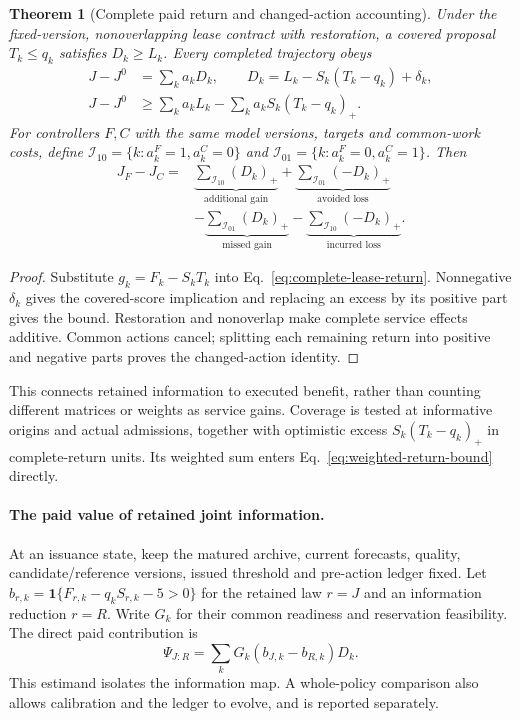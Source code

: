 \documentclass[10pt]{article}
\newtheorem{theorem}{Theorem}
\begin{document}
\begin{theorem}[Complete paid return and changed-action accounting]
\label{thm:paid-return}
Under the fixed-version, nonoverlapping lease contract with restoration,
a covered proposal $T_k\leq q_k$ satisfies $D_k\geq L_k$.
Every completed trajectory obeys
\begin{equation}
\begin{aligned}
 J-J^0&=\sum_k a_kD_k,\qquad
 D_k=L_k-S_k(T_k-q_k)+\delta_k,\\
 J-J^0&\geq\sum_k a_kL_k-\sum_k a_kS_k(T_k-q_k)_+.
\end{aligned}
\label{eq:weighted-return-bound}
\end{equation}
For controllers $F,C$ with the same model versions, targets and common-work
costs, define $\mathcal I_{10}=\{k:a_k^F=1,a_k^C=0\}$ and
$\mathcal I_{01}=\{k:a_k^F=0,a_k^C=1\}$. Then
\begin{equation}
\begin{aligned}
 J_F-J_C={}&\underbrace{\sum_{\mathcal I_{10}}(D_k)_+}_{\text{additional gain}}
 +\underbrace{\sum_{\mathcal I_{01}}(-D_k)_+}_{\text{avoided loss}}\\
 &-\underbrace{\sum_{\mathcal I_{01}}(D_k)_+}_{\text{missed gain}}
 -\underbrace{\sum_{\mathcal I_{10}}(-D_k)_+}_{\text{incurred loss}}.
\end{aligned}
\label{eq:action-gain-decomposition}
\end{equation}
\end{theorem}
\begin{proof}
Substitute $g_k=F_k-S_kT_k$ into
Eq.~\eqref{eq:complete-lease-return}. Nonnegative $\delta_k$ gives the
covered-score implication and replacing an excess by its positive part
gives the bound. Restoration and nonoverlap make complete service effects
additive. Common actions cancel; splitting each remaining return into
positive and negative parts proves the changed-action identity.
\end{proof}
This connects retained information to executed benefit, rather than
counting different matrices or weights as service gains. Coverage is tested
at informative origins and actual admissions, together with optimistic
excess $S_k(T_k-q_k)_+$ in complete-return units. Its weighted sum enters
Eq.~\eqref{eq:weighted-return-bound} directly.

\paragraph{The paid value of retained joint information.}
At an issuance state, keep the matured archive, current forecasts, quality,
candidate/reference versions, issued threshold and pre-action ledger fixed.
Let $b_{r,k}=\mathbf1\{F_{r,k}-q_kS_{r,k}-5>0\}$ for the retained law
$r=J$ and an information reduction $r=R$. Write $G_k$ for their common
readiness and reservation feasibility. The direct paid contribution is
\begin{equation}
 \Psi_{J:R}=\sum_kG_k(b_{J,k}-b_{R,k})D_k.
 \label{eq:paid-retained-information}
\end{equation}
This estimand isolates the information map. A whole-policy comparison also
allows calibration and the ledger to evolve, and is reported separately.
\end{document}
